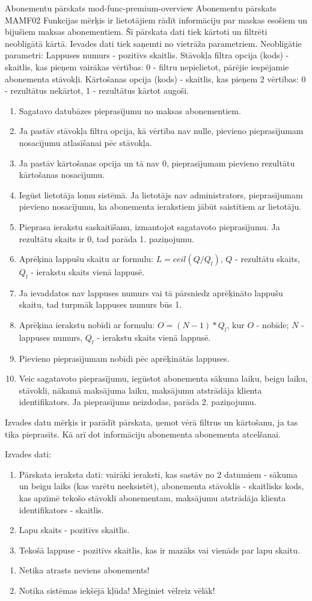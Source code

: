 \moduleFunctionTable
{Abonementu pārskats}
{mod-func-premium-overview}
{Abonementu pārskats}
{MAMF02}
{
	Funkcijas mērķis ir lietotājiem rādīt informāciju par maskas esošiem un bijušiem maksas abonementiem. Šī pārskata dati tiek kārtoti un filtrēti neobligātā kārtā.
}
{
	Ievades dati tiek saņemti no vietrāža parametriem.
	Neobligātie parametri:
	Lappuses numurs - pozitīvs skaitlis.
	Stāvokļa filtra opcija  (kods) - skaitlis, kas pieņem vairākas vērtības: 0 - filtru nepielietot, pārējie iespējamie abonementa stāvokļi.
	Kārtošanas opcija (kods) - skaitlis, kas pieņem 2 vērtības: 0 - rezultātus nekārtot, 1 -  rezultātus kārtot augoši.
}
{
	\begin{enumerate}
		\item Sagatavo datubāzes pieprasījumu no maksas abonementiem.
		\item Ja pastāv stāvokļa filtra opcija, kā vērtība nav nulle, pievieno pieprasījumam nosacījumu atlasīšanai pēc stāvokļa.
		\item Ja pastāv kārtošanas opcija un tā nav 0, pieprasījumam pievieno rezultātu kārtošanas nosacījumu.
		\item Iegūst lietotāja lomu sistēmā.
		      Ja lietotājs nav administrators, pieprasījumam pievieno nosacījumu, ka abonementa ierakstiem jābūt saistītiem ar lietotāju.
		\item Pieprasa ierakstu saskaitīšanu, izmantojot sagatavoto pieprasījumu.
		      Ja rezultātu skaits ir 0, tad parāda 1. paziņojumu.
		\item Aprēķina lappušu skaitu ar formulu: $L = ceil(Q / Q_l)$, $Q$ - rezultātu skaits, $Q_l$ - ierakstu skaits vienā lappusē.
		\item Ja ievaddatos nav lappuses numurs vai tā pārsniedz aprēķināto lappušu skaitu, tad turpmāk lappuses numurs būs 1.
		\item Aprēķina ierakstu nobīdi ar formulu: $O = (N - 1) * Q_l$, kur $O$ - nobīde; $N$ - lappuses numurs, $Q_l$ - ierakstu skaits vienā lappusē.
		\item Pievieno pieprasījumam nobīdi pēc aprēķinātās lappuses.
		\item Veic sagatavoto pieprasījumu, iegūstot abonementa sākuma laiku, beigu laiku, stāvokli, nākamā maksājuma laiku, maksājumu atstrādāja klienta identifikators.
		      Ja pieprasījums neizdodas, parāda 2. paziņojumu.
	\end{enumerate}
}
{
	Izvades datu mērķis ir parādīt pārskata, ņemot vērā filtrus un kārtošanu, ja tas tika pieprasīts.
	Kā arī dot informāciju abonementa abonementa atcelšanai.

	Izvades dati:
	\begin{enumerate}
		\item Pārskata ieraksta dati: vairāki ieraksti, kas sastāv no 2 datumiem - sākuma un beigu laiks (kas varētu neeksistēt),
		      abonementa stāvoklis - skaitlisks kods, kas apzīmē tekošo stāvokli abonementam, maksājumu atstrādāja klienta identifikators - skaitlis.
		\item Lapu skaits - pozitīvs skaitlis.
		\item Tekošā lappuse - pozitīvs skaitlis, kas ir mazāks vai vienāds par lapu skaitu.
	\end{enumerate}
}
{
	\begin{enumerate}
		\item Netika atrasts neviens abonements!
		\item Notika sistēmas iekšējā kļūda! Mēģiniet vēlreiz vēlāk!
	\end{enumerate}
}
